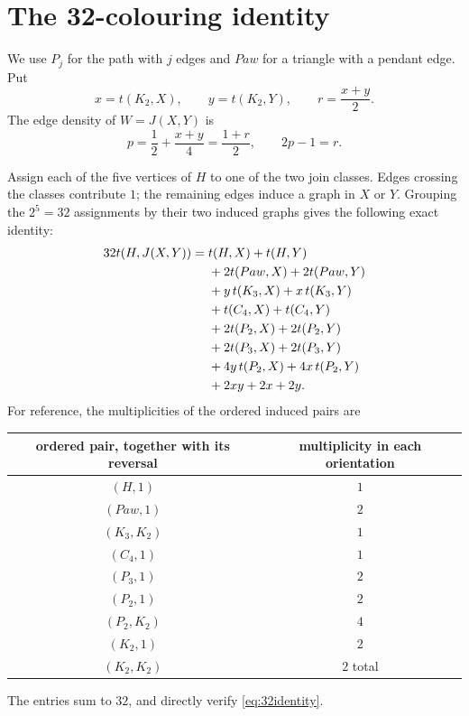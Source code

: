 \documentclass[11pt]{article}
\begin{document}
\section{The 32-colouring identity}

We use \(P_j\) for the path with \(j\) edges and \(Paw\) for a triangle
with a pendant edge.  Put
\[
 x=t(K_2,X),\qquad y=t(K_2,Y),\qquad r=\frac{x+y}{2}.
\]
The edge density of \(W=J(X,Y)\) is
\begin{equation}\label{eq:p-r}
 p=\frac12+\frac{x+y}{4}=\frac{1+r}{2},
 \qquad 2p-1=r.
\end{equation}

Assign each of the five vertices of \(H\) to one of the two join classes.
Edges crossing the classes contribute \(1\); the remaining edges induce a
graph in \(X\) or \(Y\).  Grouping the \(2^5=32\) assignments by their two
induced graphs gives the following exact identity:
\begin{align}
32t(H,J(X,Y))={}&t(H,X)+t(H,Y)\notag\\
&+2t(Paw,X)+2t(Paw,Y)\notag\\
&+y\,t(K_3,X)+x\,t(K_3,Y)\notag\\
&+t(C_4,X)+t(C_4,Y)\notag\\
&+2t(P_2,X)+2t(P_2,Y)\notag\\
&+2t(P_3,X)+2t(P_3,Y)\notag\\
&+4y\,t(P_2,X)+4x\,t(P_2,Y)\notag\\
&+2xy+2x+2y.\label{eq:32identity}
\end{align}
For reference, the multiplicities of the ordered induced pairs are
\begin{center}
\begin{tabular}{c|c}
ordered pair, together with its reversal&multiplicity in each orientation\\
\midrule
\((H,1)\)&\(1\)\\
\((Paw,1)\)&\(2\)\\
\((K_3,K_2)\)&\(1\)\\
\((C_4,1)\)&\(1\)\\
\((P_3,1)\)&\(2\)\\
\((P_2,1)\)&\(2\)\\
\((P_2,K_2)\)&\(4\)\\
\((K_2,1)\)&\(2\)\\
\((K_2,K_2)\)&\(2\) total
\end{tabular}
\end{center}
The entries sum to \(32\), and directly verify \eqref{eq:32identity}.
\end{document}

